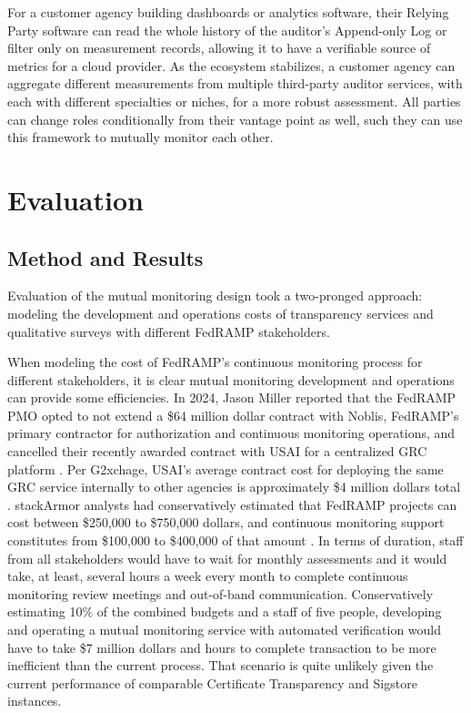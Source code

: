 \documentclass{jdf}
\begin{document}
For a customer agency building dashboards or analytics software, their Relying Party software can read the whole history of the auditor's Append-only Log or filter only on measurement records, allowing it to have a verifiable source of metrics for a cloud provider. As the ecosystem stabilizes, a customer agency can aggregate different measurements from multiple third-party auditor services, with each with different specialties or niches, for a more robust assessment. All parties can change roles conditionally from their vantage point as well, such they can use this framework to mutually monitor each other.

\section{Evaluation}

\subsection{Method and Results}

Evaluation of the mutual monitoring design took a two-pronged approach: modeling the development and operations costs of transparency services and qualitative surveys with different FedRAMP stakeholders.

When modeling the cost of FedRAMP's continuous monitoring process for different stakeholders, it is clear mutual monitoring development and operations can provide some efficiencies. In 2024, Jason Miller reported that the FedRAMP PMO opted to not extend a \$64 million dollar contract with Noblis, FedRAMP's primary contractor for authorization and continuous monitoring operations, and cancelled their recently awarded contract with USAI for a centralized GRC platform \citeyear{miller25}. Per G2xchage, USAI's average contract cost for deploying the same GRC service internally to other agencies is approximately \$4 million dollars total \citeyear{g2xchange_usai25}. stackArmor analysts had conservatively estimated that FedRAMP projects can cost between \$250,000 to \$750,000 dollars, and continuous monitoring support constitutes from \$100,000 to \$400,000 of that amount \citeyear{stackarmor24}. In terms of duration, staff from all stakeholders would have to wait for monthly assessments and it would take, at least, several hours a week every month to complete continuous monitoring review meetings and out-of-band communication. Conservatively estimating 10\% of the combined budgets and a staff of five people, developing and operating a mutual monitoring service with automated verification would have to take \$7 million dollars and hours to complete transaction to be more inefficient than the current process. That scenario is quite unlikely given the current performance of comparable Certificate Transparency and Sigstore instances.
\end{document}
